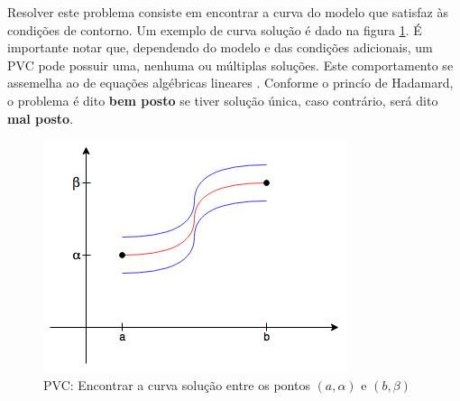 Resolver este problema consiste em encontrar a curva do modelo que satisfaz às condições de contorno. Um exemplo de curva solução é dado na figura \ref{fig:pvc}. É importante notar que, dependendo do modelo e das condições adicionais, um PVC pode possuir uma, nenhuma ou múltiplas soluções. Este comportamento se assemelha ao de equações algébricas lineares \citep[p. 448]{boyce_diprima}. Conforme o princío de Hadamard, o problema é dito \textbf{bem posto} se tiver solução única, caso contrário, será dito \textbf{mal posto}.

\begin{figure}[ht!]
\centering
\includegraphics[scale=0.5]{figuras/pvc.png}
\caption{PVC: Encontrar a curva solução entre os pontos $ (a, \alpha) $ e $ (b, \beta) $}
\label{fig:pvc}
\end{figure}

